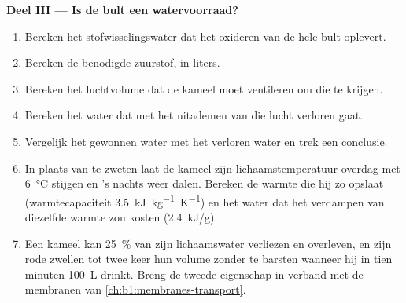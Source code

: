 \begin{problem}
\medskip
\noindent\textbf{Deel III --- Is de bult een watervoorraad?}
\begin{enumerate}[resume]
  \item Bereken het stofwisselingswater dat het oxideren van de hele bult
        oplevert.
  \item Bereken de benodigde zuurstof, in liters.
  \item Bereken het luchtvolume dat de kameel moet ventileren om die te
        krijgen.
  \item Bereken het water dat met het uitademen van die lucht verloren
        gaat.
  \item Vergelijk het gewonnen water met het verloren water en trek een
        conclusie.
  \item In plaats van te zweten laat de kameel zijn lichaamstemperatuur
        overdag met \qty{6}{\celsius} stijgen en 's nachts weer dalen.
        Bereken de warmte die hij zo opslaat (warmtecapaciteit
        \qty{3.5}{kJ.kg^{-1}.K^{-1}}) en het water dat het verdampen van
        diezelfde warmte zou kosten (\qty{2.4}{kJ/g}).
  \item Een kameel kan \qty{25}{\%} van zijn lichaamswater verliezen en
        overleven, en zijn rode  zwellen tot twee keer hun volume
        zonder te barsten wanneer hij in tien minuten \qty{100}{L} drinkt.
        Breng de tweede eigenschap in verband met de membranen van
        \cref{ch:b1:membranes-transport}.
\end{enumerate}


\end{problem}
